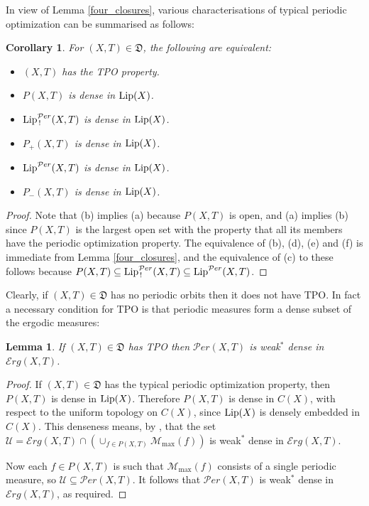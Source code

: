 \documentclass[reqno,11pt]{amsart}
\newtheorem{lem}[thm]{Lemma}
\newtheorem{cor}[thm]{Corollary}
\theoremstyle{definition}
\theoremstyle{remark}
\theoremstyle{remark}
\def\m{\mathcal M}
\def\per{{\mathcal{P}er}}
\def\e{\mathcal{E}rg}
\def\lip{{\rm Lip}}
\def\D{\mathfrak{D}}
\numberwithin{equation}{section}
\begin{document}
In view of Lemma \ref{four_closures}, various characterisations of 
typical periodic optimization
can be summarised as follows:

\begin{cor}\label{equivalentTPO}
For $(X,T)\in\D$, the following are equivalent:
\begin{itemize}
\item[(a)] $(X,T)$ has the TPO property.
\item[(b)] $P(X,T)$ is dense in $\lip(X)$.
\item[(c)] $\lip_{\, !}^{\per}(X,T)$  is dense in $\lip(X)$.
\item[(d)] $P_+(X,T)$ is dense in $\lip(X)$.
\item[(e)] $\lip^{\per}(X,T)$  is dense in $\lip(X)$.
\item[(f)]  $P_-(X,T)$ is dense in $\lip(X)$.
\end{itemize}
\end{cor}
\begin{proof}
Note that (b) implies (a) because $P(X,T)$ is open, 
and (a) implies (b) since $P(X,T)$ is the largest open set with the property that all its members have the periodic optimization property. 
The equivalence of (b), (d), (e) and (f) is immediate from Lemma \ref{four_closures},
and the equivalence of (c) to these follows because
$P(X,T)\subseteq \lip_{\, !}^\per(X,T)\subseteq\lip^\per(X,T)$.
\end{proof}

Clearly, if $(X,T)\in\D$ has no periodic orbits then it does not have TPO.
In fact a necessary condition for 
TPO is that periodic measures form a dense
subset of the ergodic measures:

\begin{lem}\label{periodicdenseinergodic}
If  $(X,T)\in\D$  has 
TPO
then $\per(X,T)$ is weak$^*$ dense in $\e(X,T)$.
\end{lem}
\begin{proof}
If  $(X,T)\in\D$  has the typical periodic optimization property, then $P(X,T)$ is dense in $\lip(X)$.
Therefore $P(X,T)$ is dense in $C(X)$, with respect to the uniform topology on $C(X)$, since 
$\lip(X)$ is densely embedded in $C(X)$.
This denseness means, by \cite[Lem.~3.4]{Mor10},
that the set
$\mathcal{U}=\e(X,T) \cap \left(\cup_{f\in P(X,T)} \m_{\max}(f) \right)
$
is weak$^*$ dense in $\e(X,T)$.

Now each $f\in P(X,T)$ is such that $\m_{\max}(f)$ consists of a single periodic measure,
so $\mathcal{U}\subseteq \per(X,T)$.
It follows that $\per(X,T)$ is weak$^*$ dense in $\e(X,T)$, as required.
\end{proof}
\end{document}
